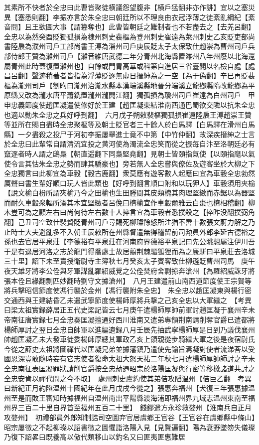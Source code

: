 其素所不快者於全忠曰此曹皆聚徒横議怨望腹非【横戶猛翻非亦作誹】宜以之塞災異【塞悉則翻】李振亦言於朱全忠曰朝廷所以不理良由衣冠浮薄之徒紊亂綱紀【紊音問】且王欲圖大事【謂簒奪也】此曹皆朝廷之難制者也不若盡去之【去羌呂翻】全忠以為然癸酉貶獨孤損為棣州刺史裴樞為登州刺史崔遠為萊州刺史乙亥貶吏部尚書陸扆為濮州司戶工部尚書王溥為淄州司戶庚辰貶太子太保致仕趙崇為曹州司戶兵部侍郎王贊為濰州司戶【濰音維唐武德二年分青州北海縣置濰州八年州廢以北海還屬青州此時蓋復置濰州也】自餘或門胄高華或科第自進居三省臺閣以名檢自處【處昌呂翻】聲迹稍著者皆指為浮薄貶逐無虛日搢紳為之一空【為于偽翻】辛巳再貶裴樞為瀧州司戶【劉昫曰瀧州治瀧水縣本漢端溪縣地晉分端溪立龍鄉縣隋改龍鄉為平原縣又改為瀧水唐平蕭銑置瀧州瀧閭江翻】獨孤損為瓊州司戶崔遠為白州司戶　甲申忠義節度使趙匡凝遣使修好於王建【趙匡凝東結淮南西通巴蜀欲交隣以抗朱全忠也適以動朱全忠之兵好呼到翻】　六月戊子朔敕裴樞獨孤損崔遠陸扆王溥趙崇王贊等並所在賜自盡時全忠聚樞等及朝士貶官者三十餘人於白馬驛【白馬驛在滑州白馬縣】一夕盡殺之投尸于河初李振屢舉進士竟不中第【中竹仲翻】故深疾搢紳之士言於全忠曰此輩常自謂清流宜投之黄河使為濁流全忠笑而從之振每自汴至洛朝廷必有竄逐者時人謂之鴟梟【朝直遥翻下同梟堅堯翻】見朝士皆頤指氣使【以頤指麾以氣使令言其怙朱全忠之勢而肆其驕豪也】旁若無人全忠嘗與僚佐及遊客坐於大柳之下全忠獨言曰此柳宜為車轂【轂古鹿翻】衆莫應有遊客數人起應曰宜為車轂全忠勃然厲聲曰書生輩好順口玩人皆此類也【好呼到翻言順口附和以玩狎人】車轂須用夾榆【說文榆白枌所謂夾榆乃今之田榆也生田塍間其皮類槐其肉理堅緻而赤鋸以為器堅而耐久車轂衆輻所湊其木宜堅緻者呂俛曰櫅榆宜作車轂爾雅云白棗也櫅相稽翻】柳木豈可為之顧左右曰尚何待左右數十人捽言宜為車轂者悉撲殺之【捽昨没翻撲弼角翻】己丑司空致仕裴贄貶青州司戶尋賜死柳璨餘怒所注猶不啻十數張文蔚力解之乃止時士大夫避亂多不入朝壬辰敕所在州縣督遣無得稽留前司勲員外郎李延古德裕之孫也去官居平泉莊【李德裕有平泉莊在河南府界德裕平泉記曰先公眺想屬注伊川吾于是有退居河洛之志於龍門得喬處士故居翦荆棘驅狐狸而為之康駢曰平泉莊去洛城三十里】詔下未至責授衛尉寺主簿秋七月癸亥太子賓客致仕柳遜貶曹州司馬　庚午夜天雄牙將李公佺與牙軍謀亂羅紹威覺之公佺焚府舍剽掠奔滄州【為羅紹威誅牙將張本佺且緣翻剽匹妙翻時劉守文據滄州】　八月王建遣前山南西道節度使王宗賀等將兵擊昭信節度使馮行襲於金州【馮行襲附朱全忠】　朱全忠以趙匡凝東與楊行密交通西與王建結昏乙未遣武寧節度使楊師厚將兵撃之己亥全忠以大軍繼之　【考異曰梁太祖實録薛居正五代史梁記皆云七月庚午遣楊師厚帥前軍討趙匡凝于襄州辛未帝南征唐實録七月全忠奏匡凝擅通好西川淮南又遣弟專領荆南請削奪官爵已遣都將楊師厚討之翌日全忠自帥軍以進編遺録八月壬辰先抽武寧楊師厚是日到乃議伐襄州帥趙匡凝乙未大發車徒委楊師厚總其軍政乙亥上領親從步騎繼大軍之後是夜宿尉氏今從之薛史太祖將圖禪代以匡凝兄弟並據藩鎮乃遣使先諭旨焉凝對使者流涕荅以受國恩深豈敢隨時妄有它志使者復命太祖大怒天祐二年秋七月遣楊師厚帥師討之辛未全忠南征表匡凝罪狀請削官爵按全忠劫遷昭宗於洛陽匡凝與行密等移檄諸道共討之全忠安肯以禪代問之今不取】　處州刺史盧約使其弟佶攻䧟温州【佶巨乙翻　考異曰新紀正月約陷温州十國紀年在此月戊戌今從之】張惠奔福州【犬復三年張惠據温州至是而敗王審知時據福州自温州南出平陽縣渡海浦即福州界九域志温州東南至福州界三百二十里自界首至福州五百二十里】　錢鏐遣方永珍救婺州【淮南兵自正月攻婺州】　初禮部員外郎知制誥司空圖弃官居虞鄉王官谷【王官谷在虞鄉縣中條山】昭宗屢徵之不起柳璨以詔書徵之圖懼詣洛陽入見【見賢遍翻】陽為衰野墜笏失儀璨乃復下詔畧曰既養高以傲代類移山以釣名又曰匪夷匪惠難居
